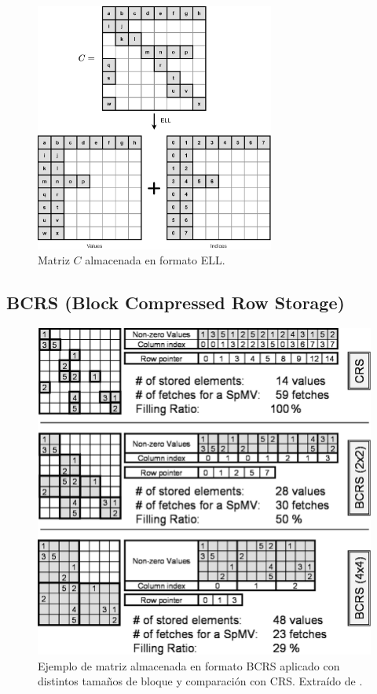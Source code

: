 \begin{figure}
    \centering
    \includegraphics[width=0.7\textwidth]{imagenes/chapter2/ell.png}
    \caption{Matriz $C$ almacenada en formato ELL.}
    \label{fig:ell-matrix}
\end{figure}


\subsection{BCRS (Block Compressed Row Storage)}\label{bcrs}

\begin{figure}
    \centering
    \includegraphics[width=\textwidth]{imagenes/chapter2/bcrs.png}
    \caption{Ejemplo de matriz almacenada en formato BCRS aplicado con distintos tamaños de bloque y comparación con CRS. Extraído de \cite{Buatois2009}.}
    \label{fig:bcrs}
\end{figure}

